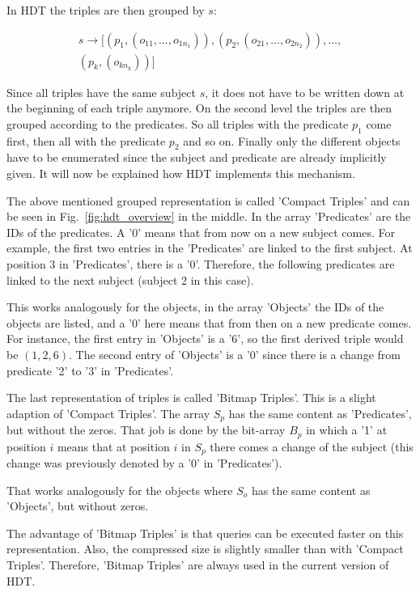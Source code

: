 In HDT the triples are then grouped by $s$:

\begin{align*}
s \to [(p_1,(o_{11},...,o_{1n_1})),(p_2,(o_{21},...,o_{2n_2})),...,\\
 (p_k , (o_{kn_k} ))]
\end{align*}

Since all triples have the same subject $s$, it does not have to be written down at the beginning of each triple anymore. On the second level the triples are then grouped according to the predicates. So all triples with the predicate $p_1$ come first, then all with the predicate $p_2$ and so on. Finally only the different objects have to be enumerated since the subject and predicate are already implicitly given. It will now be explained how HDT implements this mechanism.

The above mentioned grouped representation is called 'Compact Triples' and can be seen in Fig.~\ref{fig:hdt_overview} in the middle. In the array 'Predicates' are the IDs of the predicates. A '0' means that from now on a new subject comes. For example, the first two entries in the 'Predicates' are linked to the first subject. At position 3 in 'Predicates', there is a '0'. Therefore, the following predicates are linked to the next subject (subject 2 in this case).

This works analogously for the objects, in the array 'Objects' the IDs of the objects are listed, and a '0' here means that from then on a new predicate comes. For instance, the first entry in 'Objects' is a '6', so the first derived triple would be $(1,2,6)$. The second entry of 'Objects' is a '0' since there is a change from predicate '2' to '3' in 'Predicates'.

The last representation of triples is called 'Bitmap Triples'.  This is a slight adaption of 'Compact Triples'. The array $S_p$ has the same content as 'Predicates', but without the zeros. That job is done by the bit-array $B_p$ in which a '1' at position $i$ means that at position $i$ in $S_p$ there comes a change of the subject (this change was previously denoted by a '0' in 'Predicates'). 

That works analogously for the objects where $S_o$ has the same content as 'Objects', but without zeros.

The advantage of 'Bitmap Triples' is that queries can be executed faster on this representation. Also, the compressed size is slightly smaller than with 'Compact Triples'. Therefore, 'Bitmap Triples' are always used in the current version of HDT.

